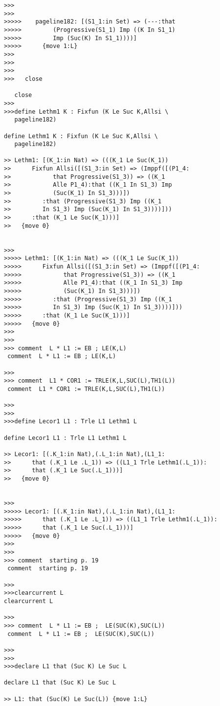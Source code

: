 \documentclass{article}
\begin{document}
\begin{verbatim}
>>>
>>>
>>>>>    pageline182: [(S1_1:in Set) => (---:that
>>>>>         (Progressive(S1_1) Imp ((K In S1_1)
>>>>>         Imp (Suc(K) In S1_1))))]
>>>>>      {move 1:L}
>>>
>>>
>>>
>>>   close

   close
>>>
>>>define Lethm1 K : Fixfun (K Le Suc K,Allsi \
   pageline182)

define Lethm1 K : Fixfun (K Le Suc K,Allsi \
   pageline182)

>> Lethm1: [(K_1:in Nat) => (((K_1 Le Suc(K_1))
>>      Fixfun Allsi([(S1_3:in Set) => (Imppf([(P1_4:
>>            that Progressive(S1_3)) => ((K_1
>>            Alle P1_4):that ((K_1 In S1_3) Imp
>>            (Suc(K_1) In S1_3)))])
>>         :that (Progressive(S1_3) Imp ((K_1
>>         In S1_3) Imp (Suc(K_1) In S1_3))))]))
>>      :that (K_1 Le Suc(K_1)))]
>>   {move 0}


>>>
>>>>> Lethm1: [(K_1:in Nat) => (((K_1 Le Suc(K_1))
>>>>>      Fixfun Allsi([(S1_3:in Set) => (Imppf([(P1_4:
>>>>>            that Progressive(S1_3)) => ((K_1
>>>>>            Alle P1_4):that ((K_1 In S1_3) Imp
>>>>>            (Suc(K_1) In S1_3)))])
>>>>>         :that (Progressive(S1_3) Imp ((K_1
>>>>>         In S1_3) Imp (Suc(K_1) In S1_3))))]))
>>>>>      :that (K_1 Le Suc(K_1)))]
>>>>>   {move 0}
>>>
>>>
>>> comment  L * L1 := EB ; LE(K,L)
 comment  L * L1 := EB ; LE(K,L)

>>>
>>> comment  L1 * COR1 := TRLE(K,L,SUC(L),TH1(L))
 comment  L1 * COR1 := TRLE(K,L,SUC(L),TH1(L))

>>>
>>>
>>>define Lecor1 L1 : Trle L1 Lethm1 L

define Lecor1 L1 : Trle L1 Lethm1 L

>> Lecor1: [(.K_1:in Nat),(.L_1:in Nat),(L1_1:
>>      that (.K_1 Le .L_1)) => ((L1_1 Trle Lethm1(.L_1)):
>>      that (.K_1 Le Suc(.L_1)))]
>>   {move 0}


>>>
>>>>> Lecor1: [(.K_1:in Nat),(.L_1:in Nat),(L1_1:
>>>>>      that (.K_1 Le .L_1)) => ((L1_1 Trle Lethm1(.L_1)):
>>>>>      that (.K_1 Le Suc(.L_1)))]
>>>>>   {move 0}
>>>
>>>
>>> comment  starting p. 19
 comment  starting p. 19

>>>
>>>clearcurrent L
clearcurrent L

>>>
>>> comment  L * L1 := EB ;  LE(SUC(K),SUC(L))
 comment  L * L1 := EB ;  LE(SUC(K),SUC(L))

>>>
>>>
>>>declare L1 that (Suc K) Le Suc L

declare L1 that (Suc K) Le Suc L

>> L1: that (Suc(K) Le Suc(L)) {move 1:L}



\end{verbatim}
\end{document}
